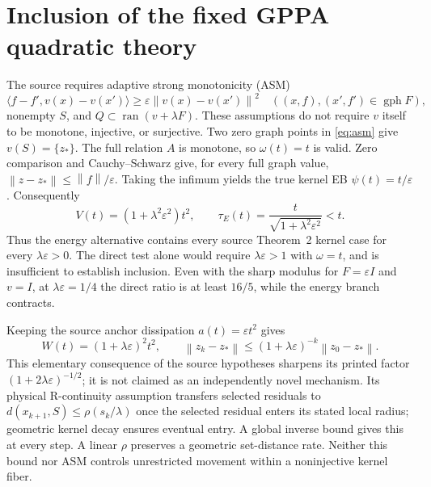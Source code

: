 \documentclass[11pt]{article}
\newcommand{\norm}[1]{\left\lVert#1\right\rVert}
\newcommand{\ip}[2]{\langle#1,#2\rangle}
\newcommand{\ran}{\operatorname{ran}}
\newcommand{\gph}{\operatorname{gph}}
\theoremstyle{remark}
\begin{document}
\section{Inclusion of the fixed GPPA quadratic theory}
The source \cite{LMT} requires adaptive strong monotonicity (ASM)
\begin{equation}\label{eq:asm}
 \ip{f-f'}{v(x)-v(x')}\ge\varepsilon\norm{v(x)-v(x')}^2
 \quad((x,f),(x',f')\in\gph F),
\end{equation}
nonempty $S$, and $Q\subset\ran(v+\lambda F)$. These assumptions do
not require $v$ itself to be monotone, injective, or surjective.
Two zero graph points in \eqref{eq:asm} give $v(S)=\{z_*\}$. The full
relation $A$ is monotone, so $\omega(t)=t$ is valid. Zero comparison
and Cauchy--Schwarz give, for every full graph value,
$\norm{z-z_*}\le\norm f/\varepsilon$. Taking the infimum yields
the true kernel EB $\psi(t)=t/\varepsilon$.
Consequently
\begin{equation}\label{eq:asminclusion}
 V(t)=(1+\lambda^2\varepsilon^2)t^2,\qquad
 \tau_E(t)=\frac{t}{\sqrt{1+\lambda^2\varepsilon^2}}<t.
\end{equation}
Thus the energy alternative contains every source Theorem~2 kernel
case for every $\lambda\varepsilon>0$. The direct test alone would
require $\lambda\varepsilon>1$ with $\omega=t$, and is insufficient
to establish inclusion. Even with the sharp modulus for $F=\varepsilon I$
and $v=I$, at $\lambda\varepsilon=1/4$ the direct ratio is at least
$16/5$, while the energy branch contracts.

Keeping the source anchor dissipation $a(t)=\varepsilon t^2$ gives
\begin{equation}\label{eq:asmrate}
 W(t)=(1+\lambda\varepsilon)^2t^2,\qquad
 \norm{z_k-z_*}\le(1+\lambda\varepsilon)^{-k}\norm{z_0-z_*}.
\end{equation}
This elementary consequence of the source hypotheses sharpens its
printed factor $(1+2\lambda\varepsilon)^{-1/2}$; it is not claimed
as an independently novel mechanism. Its physical R-continuity
assumption transfers selected residuals to
$d(x_{k+1},S)\le\rho(s_k/\lambda)$ once the selected residual enters
its stated local radius; geometric kernel decay ensures eventual entry.
A global inverse bound gives this at every step. A linear $\rho$ preserves a
geometric set-distance rate. Neither this bound nor ASM controls
unrestricted movement within a noninjective kernel fiber.
\end{document}
